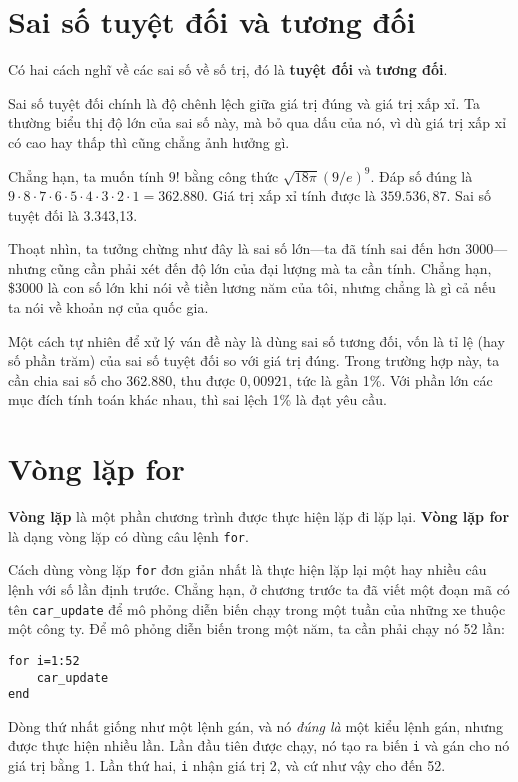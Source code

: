 \documentclass[12pt]{book}
\begin{document}
\section{Sai số tuyệt đối và tương đối}

Có hai cách nghĩ về các sai số về số trị, đó là {\bf tuyệt đối}
và {\bf tương đối}.

Sai số tuyệt đối chính là độ chênh lệch giữa giá trị đúng và giá trị 
xấp xỉ. Ta thường biểu thị độ lớn của sai số này, mà bỏ qua dấu
của nó, vì dù giá trị xấp xỉ có cao hay thấp thì cũng chẳng ảnh
hưởng gì.

Chẳng hạn, ta muốn tính $9!$ bằng công thức $\sqrt
{18 \pi} ( 9 / e)^9$.  Đáp số đúng là $9 \cdot 8 \cdot 7 \cdot 6
\cdot 5 \cdot 4 \cdot 3 \cdot 2 \cdot 1 = 362.880$.  Giá trị xấp xỉ
tính được là $359.536,87$. Sai số tuyệt đối là 3.343,13.

Thoạt nhìn, ta tưởng chừng như đây là sai số lớn---ta đã 
tính sai đến hơn 3000---nhưng cũng cần phải xét đến độ lớn
của đại lượng mà ta cần tính. Chẳng hạn, \$3000 là con số lớn
khi nói về tiền lương năm của tôi, nhưng chẳng là gì cả nếu
ta nói về khoản nợ của quốc gia.

Một cách tự nhiên để xử lý ván đề này là dùng sai số tương đối,
vốn là tỉ lệ (hay số phần trăm) của sai số tuyệt đối so với 
giá trị đúng. Trong trường hợp này, ta cần chia sai số cho
362.880, thu được $0,00921$, tức là gần 1\%. Với phần lớn
các mục đích tính toán khác nhau, thì sai lệch 1\% là đạt yêu cầu.


\section{Vòng lặp for}

{\bf Vòng lặp} là một phần chương trình được thực hiện lặp đi
lặp lại. {\bf Vòng lặp for} là dạng vòng lặp có dùng câu lệnh {\tt for}.

Cách dùng vòng lặp {\tt for} đơn giản nhất là thực hiện lặp lại
một hay nhiều câu lệnh với số lần định trước. Chẳng hạn, ở chương
trước ta đã viết một đoạn mã có tên \verb#car_update# để 
mô phỏng diễn biến chạy trong một tuần của những xe thuộc
một công ty. Để mô phỏng diễn biến trong một năm, ta cần phải
chạy nó 52 lần:

\begin{verbatim}
for i=1:52
    car_update
end
\end{verbatim}
%
Dòng thứ nhất giống như một lệnh gán, và nó {\em đúng là} một
kiểu lệnh gán, nhưng được thực hiện nhiều lần. Lần đầu tiên được
chạy, nó tạo ra biến {\tt i} và gán cho nó giá trị bằng 1. Lần thứ hai,
{\tt i} nhận giá trị 2, và cứ như vậy cho đến 52.
\end{document}
